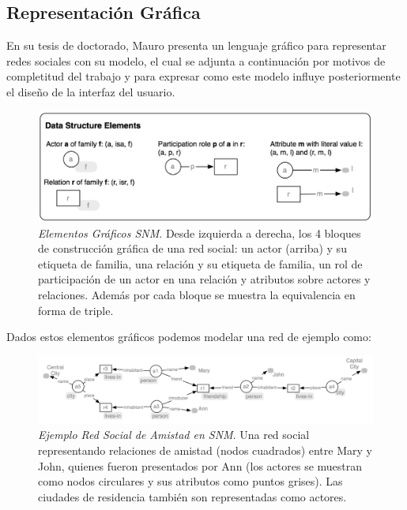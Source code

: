 
\subsection{Representación Gráfica} %
\label{sub:representacian_grafica}

En su tesis de doctorado\cite{tesismauro}, Mauro presenta un lenguaje gráfico para representar redes sociales con su modelo, el cual se adjunta a continuación por motivos de completitud del trabajo y para expresar como este modelo influye posteriormente el diseño de la interfaz del usuario.\\

\begin{figure}[H]
  \includegraphics[width=1.0\textwidth]{images/elementos_modelo_mauro.png}
  \caption[Elementos Gráficos SNM]{\emph{Elementos Gráficos SNM}. Desde izquierda a derecha, los 4 bloques de construcción gráfica de una red social: un actor (arriba) y su etiqueta de familia, una relación y su etiqueta de familia, un rol de participación de un actor en una relación y atributos sobre actores y relaciones. Además por cada bloque se muestra la equivalencia en forma de triple.}
  \label{elementos_graficos_snm}
\end{figure}

Dados estos elementos gráficos podemos modelar una red de ejemplo como:

\begin{figure}[H]
  \includegraphics[width=1.0\textwidth]{images/ejemplo_red_social_mauro.png}
  \caption[Ejemplo Red Social de Amistad en SNM]{\emph{Ejemplo Red Social de Amistad en SNM}. Una red social representando relaciones de amistad (nodos cuadrados) entre Mary y John, quienes fueron presentados por Ann (los actores se muestran como nodos circulares y sus atributos como puntos grises). Las ciudades de residencia también son representadas como actores.}
  \label{ejemplo_red_snm}
\end{figure}

